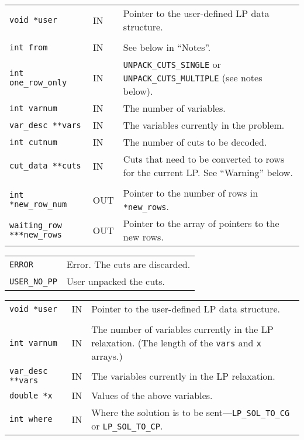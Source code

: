 \documentclass[twoside,11pt]{article}
\begin{document}
{\newpage
\clearpage
\samepage \begin{tabular}{llp{225pt}}
{\tt void *user} & IN & Pointer to the user-defined LP data structure. \\ 
& & \\ 
{\tt int from} & IN & See below in ``Notes''. \\ 
{\tt int one\_row\_only} & IN & {\tt UNPACK\_CUTS\_SINGLE} or {\tt
UNPACK\_CUTS\_MULTIPLE} (see notes below). \\ 
{\tt int varnum} & IN & The number of variables. \\ 
{\tt var\_desc **vars} & IN & The variables currently in the problem. \\ 
{\tt int cutnum} & IN & The number of cuts to be decoded. \\ 
{\tt cut\_data **cuts} & IN & Cuts that need to be converted to rows
for the current LP. See ``Warning'' below. \\ 
& & \\ 
{\tt int *new\_row\_num} & OUT & Pointer to the number of rows in
{\tt **new\_rows}. \\ 
{\tt waiting\_row ***new\_rows} & OUT & Pointer to the array of
pointers to the new rows. \\ 
\end{tabular}
}

{\newpage
\clearpage
\samepage \begin{tabular}{lp{300pt}}
{\tt ERROR} & Error. The cuts are discarded.\\ 
{\tt USER\_NO\_PP} & User unpacked the cuts.\\ 
\end{tabular}
}

{\newpage
\clearpage
\samepage \begin{tabular}{llp{285pt}}
{\tt void *user} &  IN & Pointer to the user-defined LP data structure. \\ 
& & \\ 
{\tt int varnum} & IN & The number of variables currently in the LP
relaxation. (The length of the {\tt *vars} and {\tt x} arrays.) \\ 
{\tt var\_desc **vars} & IN & The variables currently in the LP relaxation.\\ 
{\tt double *x} & IN & Values of the above variables.\\ 
{\tt int where} & IN & Where the solution is to be sent---{\tt LP\_SOL\_TO\_CG} or {\tt LP\_SOL\_TO\_CP}. \\ 
\end{tabular}
}
\end{document}
